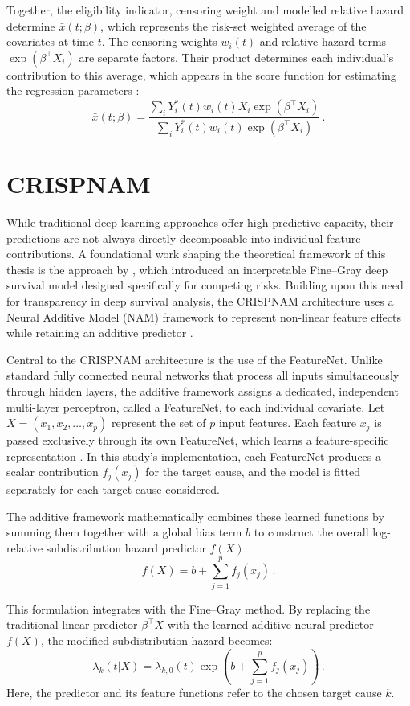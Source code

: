 \documentclass[a4paper,twoside,12pt]{report}
\begin{document}
Together, the eligibility indicator, censoring weight and modelled relative hazard determine $\bar{x}(t; \beta)$, which represents the risk-set weighted average of the covariates at time $t$. The censoring weights $w_i(t)$ and relative-hazard terms $\exp(\beta^\top X_i)$ are separate factors. Their product determines each individual's contribution to this average, which appears in the score function for estimating the regression parameters \citep{FineGray1999}:
$$\bar{x}(t; \beta)=\frac{\sum_i Y_i^*(t) w_i(t) X_i \exp(\beta^\top X_i)}{\sum_i Y_i^*(t) w_i(t) \exp(\beta^\top X_i)} \,.$$

\section{CRISPNAM}

While traditional deep learning approaches offer high predictive capacity, their predictions are not always directly decomposable into individual feature contributions. A foundational work shaping the theoretical framework of this thesis is the approach by \cite{InterpretableFineGray2025}, which introduced an interpretable Fine--Gray deep survival model designed specifically for competing risks. Building upon this need for transparency in deep survival analysis, the CRISPNAM architecture uses a Neural Additive Model (NAM) framework to represent non-linear feature effects while retaining an additive predictor \citep{InterpretableFineGray2025}.

Central to the CRISPNAM architecture is the use of the FeatureNet. Unlike standard fully connected neural networks that process all inputs simultaneously through hidden layers, the additive framework assigns a dedicated, independent multi-layer perceptron, called a FeatureNet, to each individual covariate. Let $X = (x_1, x_2, \dots, x_p)$ represent the set of $p$ input features. Each feature $x_j$ is passed exclusively through its own FeatureNet, which learns a feature-specific representation \citep{InterpretableFineGray2025}. In this study's implementation, each FeatureNet produces a scalar contribution $f_j(x_j)$ for the target cause, and the model is fitted separately for each target cause considered.

The additive framework mathematically combines these learned functions by summing them together with a global bias term $b$ to construct the overall log-relative subdistribution hazard predictor $f(X)$:
$$f(X) = b + \sum_{j=1}^p f_j(x_j) \,.$$

This formulation integrates with the Fine--Gray method. By replacing the traditional linear predictor $\beta^\top X$ with the learned additive neural predictor $f(X)$, the modified subdistribution hazard becomes:
$$\tilde{\lambda}_k(t|X) = \tilde{\lambda}_{k,0}(t)\exp\left(b + \sum_{j=1}^p f_j(x_j)\right) \,.$$
Here, the predictor and its feature functions refer to the chosen target cause $k$.
\end{document}
